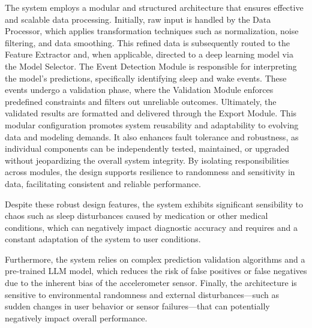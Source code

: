 \documentclass[conference]{IEEEtran}
\begin{document}
The system employs a modular and structured architecture that ensures effective and scalable data processing. Initially,
raw input is handled by the Data Processor, which applies transformation techniques such as normalization, noise filtering,
and data smoothing. This refined data is subsequently routed to the Feature Extractor and, when applicable, directed to a deep
learning model via the Model Selector. The Event Detection Module is responsible for interpreting the model's predictions,
specifically identifying sleep and wake events. These events undergo a validation phase, where the Validation Module enforces
predefined constraints and filters out unreliable outcomes. Ultimately, the validated results are formatted and delivered through
the Export Module.
This modular configuration promotes system reusability and adaptability to evolving data and modeling demands.
It also enhances fault tolerance and robustness, as individual components can be independently tested, maintained,
or upgraded without jeopardizing the overall system integrity. By isolating responsibilities across modules,
the design supports resilience to randomness and sensitivity in data, facilitating consistent and reliable performance.

Despite these robust design features, the system exhibits significant sensibility to chaos such as sleep disturbances
caused by medication or other medical conditions, which can negatively impact diagnostic accuracy and requires and
a constant adaptation of the system to user conditions.

Furthermore, the system relies on complex prediction validation algorithms and a pre-trained LLM model, which reduces
the risk of false positives or false negatives due to the inherent bias of the accelerometer sensor. Finally, the
architecture is sensitive to environmental randomness and external disturbances—such as sudden changes in user behavior
or sensor failures—that can potentially negatively impact overall performance.



\end{document}
